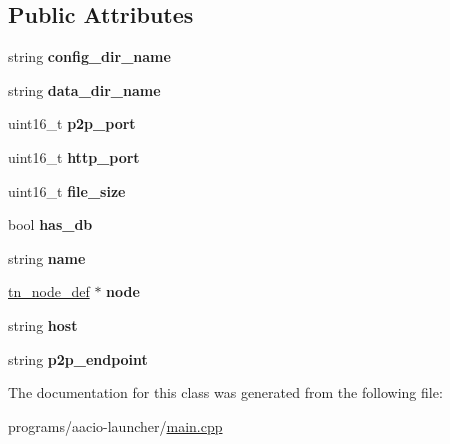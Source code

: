 \subsection*{Public Attributes}
\begin{DoxyCompactItemize}
\item 
\mbox{\label{classaacd__def_aeeeafac6a7b20ceb2fdb663703bf6c0a}} 
string {\bfseries config\+\_\+dir\+\_\+name}
\item 
\mbox{\label{classaacd__def_a1d41e8a411cb8c677ac2d4aa3e0f67e2}} 
string {\bfseries data\+\_\+dir\+\_\+name}
\item 
\mbox{\label{classaacd__def_a7dba141a18933e1ab31c77f531650264}} 
uint16\+\_\+t {\bfseries p2p\+\_\+port}
\item 
\mbox{\label{classaacd__def_aee00cfd35e28aae6c77bd69ace5aabed}} 
uint16\+\_\+t {\bfseries http\+\_\+port}
\item 
\mbox{\label{classaacd__def_a55bdac7b4dd11b5f4f735c5f94621164}} 
uint16\+\_\+t {\bfseries file\+\_\+size}
\item 
\mbox{\label{classaacd__def_a6a431ed8c66764580235d0e9516be330}} 
bool {\bfseries has\+\_\+db}
\item 
\mbox{\label{classaacd__def_a85cd109e62321b98671be4a1b3e981e7}} 
string {\bfseries name}
\item 
\mbox{\label{classaacd__def_ae85cf6a7a4e05a7b8e650b5c1e656595}} 
\mbox{\hyperlink{classtn__node__def}{tn\+\_\+node\+\_\+def}} $\ast$ {\bfseries node}
\item 
\mbox{\label{classaacd__def_a25f427703ecd1dabf60e2c49747867ad}} 
string {\bfseries host}
\item 
\mbox{\label{classaacd__def_a215e2ffd0d7aa58da8d903f753fdf832}} 
string {\bfseries p2p\+\_\+endpoint}
\end{DoxyCompactItemize}


The documentation for this class was generated from the following file\+:\begin{DoxyCompactItemize}
\item 
programs/aacio-\/launcher/\mbox{\hyperlink{programs_2aacio-launcher_2main_8cpp}{main.\+cpp}}\end{DoxyCompactItemize}
